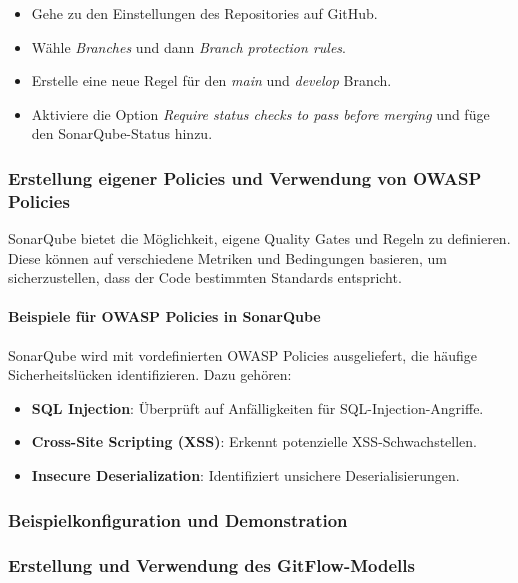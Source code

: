 \begin{itemize}
    \item Gehe zu den Einstellungen des Repositories auf GitHub.
    \item Wähle \textit{Branches} und dann \textit{Branch protection rules}.
    \item Erstelle eine neue Regel für den \textit{main} und \textit{develop} Branch.
    \item Aktiviere die Option \textit{Require status checks to pass before merging} und füge den SonarQube-Status hinzu.
\end{itemize}

\subsubsection{Erstellung eigener Policies und Verwendung von OWASP Policies}

SonarQube bietet die Möglichkeit, eigene Quality Gates und Regeln zu definieren. Diese können auf verschiedene Metriken und Bedingungen basieren, um sicherzustellen, dass der Code bestimmten Standards entspricht.

\paragraph{Beispiele für OWASP Policies in SonarQube}

SonarQube wird mit vordefinierten OWASP Policies ausgeliefert, die häufige Sicherheitslücken identifizieren. Dazu gehören:

\begin{itemize}
    \item \textbf{SQL Injection}: Überprüft auf Anfälligkeiten für SQL-Injection-Angriffe.
    \item \textbf{Cross-Site Scripting (XSS)}: Erkennt potenzielle XSS-Schwachstellen.
    \item \textbf{Insecure Deserialization}: Identifiziert unsichere Deserialisierungen.
\end{itemize}

\subsubsection{Beispielkonfiguration und Demonstration}

\subsubsection{Erstellung und Verwendung des GitFlow-Modells}

